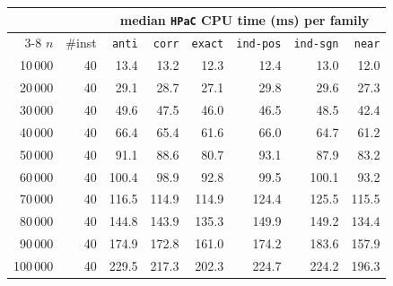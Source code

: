 \begin{tabular}{@{}rrrrrrrr@{}}
\toprule
 &  & \multicolumn{6}{c}{median \texttt{HPaC} CPU time (ms) per family} \\
\cmidrule(l){3-8}
$n$ & \#inst & \texttt{anti} & \texttt{corr} & \texttt{exact} & \texttt{ind-pos} & \texttt{ind-sgn} & \texttt{near} \\
\midrule
10\,000 & 40 & 13.4 & 13.2 & 12.3 & 12.4 & 13.0 & 12.0 \\
20\,000 & 40 & 29.1 & 28.7 & 27.1 & 29.8 & 29.6 & 27.3 \\
30\,000 & 40 & 49.6 & 47.5 & 46.0 & 46.5 & 48.5 & 42.4 \\
40\,000 & 40 & 66.4 & 65.4 & 61.6 & 66.0 & 64.7 & 61.2 \\
50\,000 & 40 & 91.1 & 88.6 & 80.7 & 93.1 & 87.9 & 83.2 \\
60\,000 & 40 & 100.4 & 98.9 & 92.8 & 99.5 & 100.1 & 93.2 \\
70\,000 & 40 & 116.5 & 114.9 & 114.9 & 124.4 & 125.5 & 115.5 \\
80\,000 & 40 & 144.8 & 143.9 & 135.3 & 149.9 & 149.2 & 134.4 \\
90\,000 & 40 & 174.9 & 172.8 & 161.0 & 174.2 & 183.6 & 157.9 \\
100\,000 & 40 & 229.5 & 217.3 & 202.3 & 224.7 & 224.2 & 196.3 \\
\bottomrule
\end{tabular}
